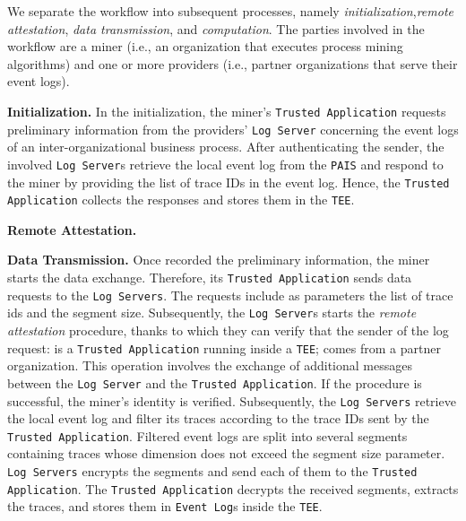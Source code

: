 %
We separate the workflow into subsequent processes, namely \textit{initialization},\textit{remote attestation}, \textit{data transmission}, and \textit{computation}.
The parties involved in the workflow are a miner (i.e., an organization that executes process mining algorithms) and one or more providers (i.e., partner organizations that serve their event logs). %

\textbf{Initialization.} In the initialization, the miner's \texttt{Trusted Application} requests preliminary information from the providers' \texttt{Log Server} concerning the event logs of an inter-organizational business process. After authenticating the sender, the involved \texttt{Log Server}s retrieve the local event log from the \texttt{PAIS} and respond to the miner by providing the list of trace IDs in the event log. Hence, the \texttt{Trusted Application} collects the responses and stores them in the \texttt{TEE}.

\textbf{Remote Attestation.} 

\textbf{Data Transmission.} Once recorded the preliminary information, the miner starts the data exchange. Therefore, its \texttt{Trusted Application} sends data requests to the \texttt{Log Servers}. The requests include as parameters the list of trace ids and the segment size. Subsequently, the \texttt{Log Server}s starts the \textit{remote attestation} procedure, thanks to which they can verify that the sender of the log request: is a \texttt{Trusted Application} running inside a \texttt{TEE}; comes from a partner organization. This operation involves the exchange of additional messages between the \texttt{Log Server} and the \texttt{Trusted Application}. If the procedure is successful, the miner's identity is verified.
Subsequently, the \texttt{Log Servers} retrieve the local event log and filter its traces according to the trace IDs sent by the \texttt{Trusted Application}. Filtered event logs are split into several segments containing traces whose dimension does not exceed the segment size parameter. \texttt{Log Servers} encrypts the segments and send each of them to the \texttt{Trusted Application}. The \texttt{Trusted Application} decrypts the received segments, extracts the traces, and stores them in \texttt{Event Log}s inside the \texttt{TEE}.


